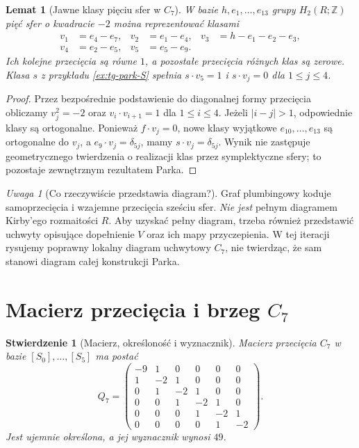 \documentclass[11pt,a4paper]{report}
\numberwithin{equation}{section}
\theoremstyle{plain}
\newtheorem{lemat}[twierdzenie]{Lemat}
\newtheorem{stwierdzenie}[twierdzenie]{Stwierdzenie}
\theoremstyle{definition}
\theoremstyle{remark}
\newtheorem{uwaga}[twierdzenie]{Uwaga}
\begin{document}
\begin{lemat}[Jawne klasy pięciu sfer w $C_7$]
\label{lem:tg-park-S-classes}
W bazie $h,e_1,\ldots,e_{13}$ grupy $H_2(R;\mathbb Z)$
pięć sfer o kwadracie $-2$ można reprezentować klasami
\[
\begin{aligned}
 v_1&=e_4-e_7,& v_2&=e_1-e_4,&
 v_3&=h-e_1-e_2-e_3,\\
 v_4&=e_2-e_5,& v_5&=e_5-e_9.
\end{aligned}
\]
Ich kolejne przecięcia są równe $1$, a pozostałe przecięcia
różnych klas są zerowe. Klasa $s$ z przykładu
\ref{ex:tg-park-S} spełnia $s\cdot v_5=1$ i
$s\cdot v_j=0$ dla $1\le j\le4$.
\end{lemat}

\begin{proof}
Przez bezpośrednie podstawienie do diagonalnej formy przecięcia
obliczamy $v_j^2=-2$ oraz
$v_i\cdot v_{i+1}=1$ dla $1\le i\le4$.
Jeżeli $|i-j|>1$, odpowiednie klasy są ortogonalne.
Ponieważ $f\cdot v_j=0$, nowe klasy wyjątkowe
$e_{10},\ldots,e_{13}$ są ortogonalne do $v_j$, a
$e_9\cdot v_j=\delta_{5j}$, mamy
$s\cdot v_j=\delta_{5j}$.
Wynik nie zastępuje geometrycznego twierdzenia o realizacji
klas przez symplektyczne sfery; to pozostaje zewnętrznym
rezultatem Parka.
\end{proof}

\begin{uwaga}[Co rzeczywiście przedstawia diagram?]
Graf plumbingowy koduje samoprzecięcia i wzajemne
przecięcia sześciu sfer. \emph{Nie jest} pełnym diagramem
Kirby'ego rozmaitości $R$. Aby uzyskać pełny diagram,
trzeba również przedstawić uchwyty opisujące dopełnienie
$V$ oraz ich mapy przyczepienia. W tej iteracji rysujemy
poprawny lokalny diagram uchwytowy $C_7$, nie twierdząc,
że sam stanowi diagram całej konstrukcji Parka.
\end{uwaga}

\section{Macierz przecięcia i brzeg \texorpdfstring{$C_7$}{C7}}
\label{sec:tg-park-boundary}

\begin{stwierdzenie}[Macierz, określoność i wyznacznik]
\label{prop:tg-park-Q}
Macierz przecięcia $C_7$ w bazie $[S_0],\ldots,[S_5]$
ma postać
\[
Q_7=\begin{pmatrix}
-9&1&0&0&0&0\\
1&-2&1&0&0&0\\
0&1&-2&1&0&0\\
0&0&1&-2&1&0\\
0&0&0&1&-2&1\\
0&0&0&0&1&-2
\end{pmatrix}.
\]
Jest ujemnie określona, a jej wyznacznik wynosi $49$.
\end{stwierdzenie}
\end{document}
